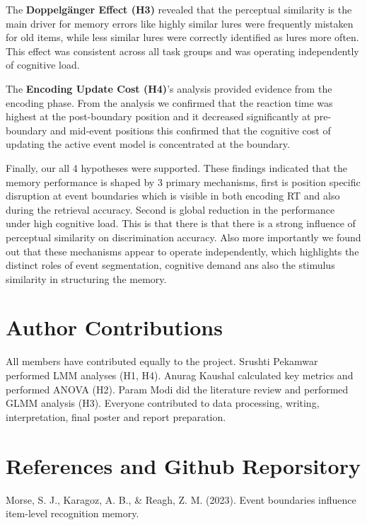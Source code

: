 \documentclass[
  12pt,
]{article}
\begin{document}
The \textbf{Doppelgänger Effect (H3)} revealed that the perceptual similarity is the main driver for memory errors like highly similar lures were frequently mistaken for old items, while less similar lures were correctly identified as lures more often. This effect was consistent across all task groups and was operating independently of cognitive load.

The \textbf{Encoding Update Cost (H4)}’s analysis provided evidence from the encoding phase. From the analysis we confirmed that the reaction time was highest at the post-boundary position and it decreased significantly at pre-boundary and mid-event positions this confirmed that the cognitive cost of updating the active event model is concentrated at the boundary.

Finally, our all 4 hypotheses were supported. These findings indicated that the memory performance is shaped by 3 primary mechanisms, first is position specific disruption at event boundaries which is visible in both encoding RT and also during the retrieval accuracy. Second is global reduction in the performance under high cognitive load. This is that there is that there is a strong influence of perceptual similarity on discrimination accuracy. Also more importantly we found out that these mechanisms appear to operate independently, which highlights the distinct roles of event segmentation, cognitive demand ans also the stimulus similarity in structuring the memory.


\section*{Author Contributions}\label{author-contributions}

All members have contributed equally to the project. Srushti Pekamwar performed LMM analyses (H1, H4). Anurag Kaushal calculated key metrics and performed ANOVA (H2). Param Modi did the literature review and performed GLMM analysis (H3). Everyone contributed to data processing, writing, interpretation, final poster and report preparation.

\section*{References and Github Reporsitory}\label{references-and-citations}

Morse, S. J., Karagoz, A. B., \& Reagh, Z. M. (2023). Event boundaries
influence item-level recognition memory.
\end{document}
